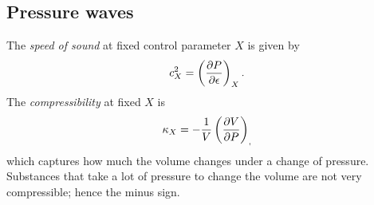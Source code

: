 \subsection{Pressure waves}
The {\it speed of sound} at fixed control parameter $X$
is given by
\begin{equation}
  c_X^2=\left(\pdv{P}{\epsilon}\right)_{X}.
\end{equation}
The {\it compressibility} at fixed $X$ is
\begin{equation}
  \kappa_X=-\frac{1}{V}\left(\pdv{V}{P}\right)_{,}
\end{equation}
which captures how much the volume changes under a change of pressure.
Substances that take a lot of pressure to change the volume are not
very compressible; hence the minus sign.



